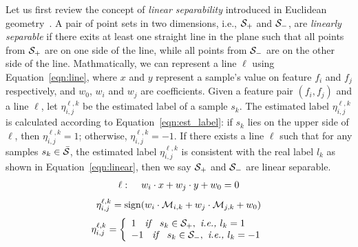 Let us first review the concept of {\em linear separability} introduced in Euclidean geometry~\cite{shamos1975geometric}. A pair of point sets in two dimensions, i.e., $\mathcal{S}_+$ and $\mathcal{S}_-$, are \emph{linearly separable} if there exits at least one straight line in the plane such that all points from $\mathcal{S}_+$ are on one side of the line, while all points from $\mathcal{S}_-$ are on the other side of the line. Mathmatically, we can represent a line $\ell$ using Equation~\ref{eqn:line}, where $x$ and $y$ represent a sample's value on feature $f_i$ and $f_j$ respectively, and $w_0$, $w_i$ and $w_j$ are coefficients. Given a feature pair $(f_i,f_j)$ and a line $\ell$, let $\eta_{i,j}^{\ell,k}$ be the estimated label of a sample $s_k$. The estimated label $\eta_{i,j}^{\ell,k}$ is calculated according to Equation~\ref{eqn:est_label}: if $s_k$ lies on the upper side of $\ell$, then $\eta_{i,j}^{\ell,k}=1$; otherwise, $\eta_{i,j}^{\ell,k}=-1$.   
If there exists a line $\ell$ such that for any samples $s_k\in \bar{\mathcal{S}}$, the estimated label $\eta_{i,j}^{\ell,k}$ is consistent with the real label $l_k$ as shown in Equation~\ref{eqn:linear}, then we say $\mathcal{S}_+$ and $\mathcal{S}_-$ are linear separable. 
\begin{equation}\label{eqn:line}
\begin{split}
\ell: \hspace{4mm} w_i\cdot x + w_j\cdot y +w_0 =0 
\end{split}
\end{equation}
\begin{equation}\label{eqn:est_label}
\eta_{i,j}^{\ell,k}=\operatorname{sign}(w_i\cdot \mathcal{M}_{i,k} + w_j\cdot \mathcal{M}_{j,k} +w_0)
\end{equation}
\begin{equation}\label{eqn:linear}
\eta_{i,j}^{\ell,k} = \left\{
                \begin{array}{ll}
                  1 \textit{\hspace{2mm} if \hspace{2mm}} s_k\in \mathcal{S}_+, \textit{ i.e., } l_k=1 \\
                  -1 \textit{\hspace{2mm} if \hspace{2mm}} s_k\in \mathcal{S}_-, \textit{ i.e., } l_k=-1 
                \end{array}
              \right.
\end{equation}



